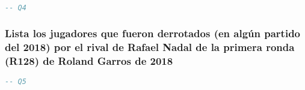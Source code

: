 \begin{lstlisting}[language=SQL]
-- Q4
\end{lstlisting}





\subsubsection{Lista los jugadores que fueron derrotados (en algún partido del 2018) por el rival de Rafael Nadal de la primera ronda (R128) de Roland Garros de 2018}

\begin{lstlisting}[language=SQL]
-- Q5
\end{lstlisting}